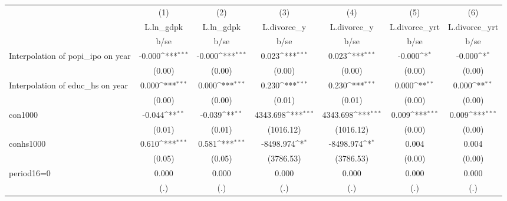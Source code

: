 {
\def\sym#1{\ifmmode^{#1}\else\(^{#1}\)\fi}
\begin{tabular}{l*{6}{c}}
\hline\hline
                    &\multicolumn{1}{c}{(1)}&\multicolumn{1}{c}{(2)}&\multicolumn{1}{c}{(3)}&\multicolumn{1}{c}{(4)}&\multicolumn{1}{c}{(5)}&\multicolumn{1}{c}{(6)}\\
                    &\multicolumn{1}{c}{L.ln\_gdpk}&\multicolumn{1}{c}{L.ln\_gdpk}&\multicolumn{1}{c}{L.divorce\_y}&\multicolumn{1}{c}{L.divorce\_y}&\multicolumn{1}{c}{L.divorce\_yrt}&\multicolumn{1}{c}{L.divorce\_yrt}\\
                    &        b/se         &        b/se         &        b/se         &        b/se         &        b/se         &        b/se         \\
\hline
Interpolation of popi\_ipo on year&      -0.000\sym{***}&      -0.000\sym{***}&       0.023\sym{***}&       0.023\sym{***}&      -0.000\sym{*}  &      -0.000\sym{*}  \\
                    &      (0.00)         &      (0.00)         &      (0.00)         &      (0.00)         &      (0.00)         &      (0.00)         \\
Interpolation of educ\_hs on year&       0.000\sym{***}&       0.000\sym{***}&       0.230\sym{***}&       0.230\sym{***}&       0.000\sym{**} &       0.000\sym{**} \\
                    &      (0.00)         &      (0.00)         &      (0.01)         &      (0.01)         &      (0.00)         &      (0.00)         \\
con1000             &      -0.044\sym{**} &      -0.039\sym{**} &    4343.698\sym{***}&    4343.698\sym{***}&       0.009\sym{***}&       0.009\sym{***}\\
                    &      (0.01)         &      (0.01)         &   (1016.12)         &   (1016.12)         &      (0.00)         &      (0.00)         \\
conhs1000           &       0.610\sym{***}&       0.581\sym{***}&   -8498.974\sym{*}  &   -8498.974\sym{*}  &       0.004         &       0.004         \\
                    &      (0.05)         &      (0.05)         &   (3786.53)         &   (3786.53)         &      (0.00)         &      (0.00)         \\
period16=0          &       0.000         &       0.000         &       0.000         &       0.000         &       0.000         &       0.000         \\
                    &         (.)         &         (.)         &         (.)         &         (.)         &         (.)         &         (.)         \\

\end{tabular}}
